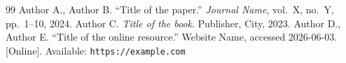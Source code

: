 
\begin{thebibliography}{99}
 Author A., Author B. ``Title of the paper.'' \emph{Journal Name}, vol.~X, no.~Y, pp.~1--10, 2024.
 Author C. \emph{Title of the book}. Publisher, City, 2023.
 Author D., Author E. ``Title of the online resource.'' Website Name, accessed 2026-06-03. [Online]. Available: \texttt{https://example.com}
\end{thebibliography}
